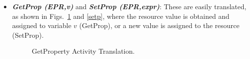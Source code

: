 \begin{itemize}
\item {\bf {\it GetProp (EPR,v)}} and {\bf {\it SetProp (EPR,expr)}}:
These are easily translated, as shown in Figs.~\ref{getp} and \ref{setp}, where the resource value is obtained and assigned to variable $v$ (GetProp), or a new value is assigned to the resource (SetProp).


\begin{figure}[!ht]
\begin{center}
\end{center}
\caption{\label{getp} GetProperty Activity Translation.}
\end{figure}

\vspace{-0.1cm}
%


\end{itemize}
